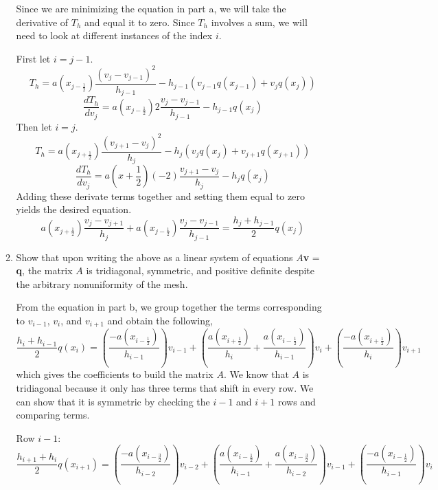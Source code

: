 \documentclass[11pt, oneside]{article}   	%
\begin{document}
\begin{enumerate}
\begin{enumerate}
\vspace{5mm}

Since we are minimizing the equation in part a, we will take the derivative of $T_h$ and equal it to zero. Since $T_h$ involves a sum, we will need to look at different instances of the index $i$. 

First let $i = j-1$.
\[
T_h = a(x_{j-\frac{1}{2}}) \frac{(v_j - v_{j-1})^2}{h_{j-1}} - h_{j-1}(v_{j-1} q(x_{j-1}) + v_j q(x_j))
\]
\[
\frac{dT_h}{d v_j} = a(x_{j - \frac{1}{2}}) 2 \frac{v_j - v_{j-1}}{h_{j-1}} - h_{j-1} q(x_j)
\]
Then let $i = j$.
\[
T_h = a(x_{j+\frac{1}{2}}) \frac{(v_{j+1} - v_j)^2}{h_j} - h_j (v_j q(x_j) + v_{j+1} q(x_{j+1}))
\]
\[
\frac{dT_h}{d v_j} = a(x+\frac{1}{2}) (-2)\frac{v_{j+1} - v_j}{h_j} - h_j q(x_j)
\]
Adding these derivate terms together and setting them equal to zero yields the desired equation.
\[
a(x_{j+\frac{1}{2}}) \frac{v_j - v_{j+1}}{h_j} + a(x_{j - \frac{1}{2}}) \frac{v_j - v_{j-1}}{h_{j-1}} = \frac{h_j + h_{j-1}}{2} q(x_j)
\]

\item Show that upon writing the above as a linear system of equations $A$\textbf{v} = \textbf{q}, the matrix $A$ is tridiagonal, symmetric, and positive definite despite the arbitrary nonuniformity of the mesh.

\vspace{5mm}

From the equation in part b, we group together the terms corresponding to $v_{i-1}$, $v_i$, and $v_{i+1}$ and obtain the following,
\[
\frac{h_i + h_{i-1}}{2} q(x_i) = \left(\frac{-a(x_{i-\frac{1}{2}})}{h_{i-1}}\right) v_{i-1} + \left( \frac{a(x_{i+\frac{1}{2}})}{h_i} + \frac{a(x_{i-\frac{1}{2}})}{h_{i-1}} \right) v_i + \left(\frac{-a(x_{i+\frac{1}{2}})}{h_i}\right) v_{i+1}
\]
which gives the coefficients to build the matrix $A$. We know that $A$ is tridiagonal because it only has three terms that shift in every row. We can show that it is symmetric by checking the $i-1$ and $i+1$ rows and comparing terms. 

Row $i-1$:
\[
\frac{h_{i+1} + h_{i}}{2} q(x_{i+1}) = \left(\frac{-a(x_{i-\frac{3}{2}})}{h_{i-2}}\right) v_{i-2} + \left( \frac{a(x_{i-\frac{1}{2}})}{h_{i-1}} + \frac{a(x_{i-\frac{3}{2}})}{h_{i-2}} \right) v_{i-1} + \left(\frac{-a(x_{i-\frac{1}{2}})}{h_{i-1}}\right) v_{i}
\]


\end{enumerate}
\end{enumerate}
\end{document}
